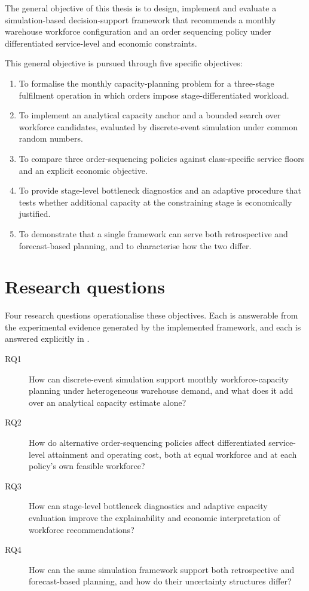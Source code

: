 The general objective of this thesis is to design, implement and evaluate a simulation-based
decision-support framework that recommends a monthly warehouse workforce configuration and an
order sequencing policy under differentiated service-level and economic constraints.

This general objective is pursued through five specific objectives:

\begin{enumerate}
  \item To formalise the monthly capacity-planning problem for a three-stage fulfilment
        operation in which orders impose stage-differentiated workload.
  \item To implement an analytical capacity anchor and a bounded search over workforce
        candidates, evaluated by discrete-event simulation under common random numbers.
  \item To compare three order-sequencing policies against class-specific service floors and
        an explicit economic objective.
  \item To provide stage-level bottleneck diagnostics and an adaptive procedure that tests
        whether additional capacity at the constraining stage is economically justified.
  \item To demonstrate that a single framework can serve both retrospective and
        forecast-based planning, and to characterise how the two differ.
\end{enumerate}

\section{Research questions}
\label{sec:research-questions}

Four research questions operationalise these objectives. Each is answerable from the
experimental evidence generated by the implemented framework, and each is answered explicitly
in .

\begin{description}
  \item[RQ1] How can discrete-event simulation support monthly workforce-capacity planning
    under heterogeneous warehouse demand, and what does it add over an analytical capacity
    estimate alone?
  \item[RQ2] How do alternative order-sequencing policies affect differentiated service-level
    attainment and operating cost, both at equal workforce and at each policy's own feasible
    workforce?
  \item[RQ3] How can stage-level bottleneck diagnostics and adaptive capacity evaluation
    improve the explainability and economic interpretation of workforce recommendations?
  \item[RQ4] How can the same simulation framework support both retrospective and
    forecast-based planning, and how do their uncertainty structures differ?
\end{description}

